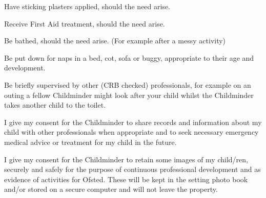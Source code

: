\documentclass[10pt]{article}
\begin{document}
\sigtable

\pagebreak

Have sticking plasters applied, should the need arise.

\sigtable

Receive First Aid treatment, should the need arise.

\sigtable

Be bathed, should the need arise.  (For example after a messy activity)

\sigtable

Be put down for naps in a bed, cot, sofa or buggy, appropriate to their age and development.

\sigtable

Be briefly supervised by other (CRB checked) professionals, for example on an outing a fellow Childminder might look after your child whilst the Childminder takes another child to the toilet.

\sigtable

I give my consent for the Childminder to share records and information about my child with other professionals when appropriate and to seek necessary emergency medical advice or treatment for my child in the future.

\sigtable

I give my consent for the Childminder to retain some images of my child/ren, securely and safely for the purpose of continuous professional development and as evidence of activities for Ofsted. These will be kept in the setting photo book and/or stored on a secure computer and will not leave the property.

\sigtable


\end{document}
